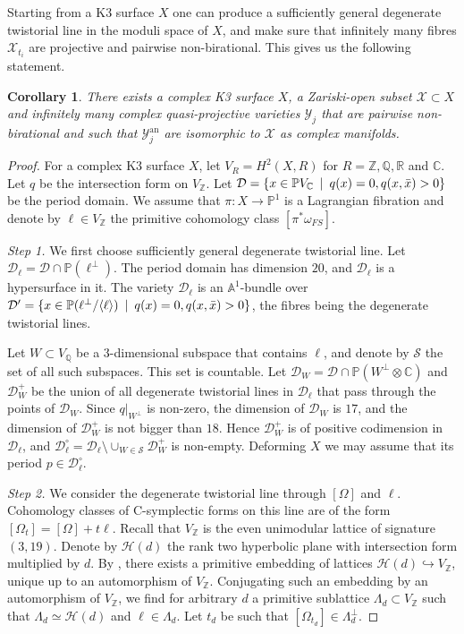 \documentclass[10pt]{amsart}
\newcommand{\bbA}{\mathbb{A}}
\newcommand{\bbZ}{\mathbb{Z}}
\newcommand{\bbQ}{\mathbb{Q}}
\newcommand{\bbR}{\mathbb{R}}
\newcommand{\bbC}{\mathbb{C}}
\newcommand{\bbP}{\mathbb{P}}
\newcommand{\DD}{\mathcal{D}}
\newcommand{\HH}{\mathcal{H}}
\newcommand{\XX}{\mathcal{X}}
\newcommand{\YY}{\mathcal{Y}}
\newcommand{\st}{\enskip |\enskip}
\newcommand{\hrarr}{\hookrightarrow}
\newtheorem{cor}[defn]{Corollary}
\begin{document}
Starting from a K3 surface $X$ one can
produce a sufficiently general degenerate twistorial line in the moduli space of $X$,
and make sure that infinitely many fibres $\XX_{t_i}$ are projective and
pairwise non-birational. This gives us the following statement.

\begin{cor}\label{cor_1}
There exists a complex K3 surface $X$, a Zariski-open subset $\XX\subset X$ and infinitely many complex quasi-projective
varieties $\YY_j$ that are pairwise non-birational and such that $\YY_j^{\mathrm{an}}$
are isomorphic to $\XX$ as complex manifolds.
\end{cor}
\begin{proof}
For a complex K3 surface $X$, let $V_R = H^2(X,R)$
for $R = \bbZ, \bbQ, \bbR$ and $\bbC$. Let $q$ be the intersection form
on $V_\bbZ$. Let $\DD = \{x\in \bbP V_{\bbC}\st q(x) = 0, q(x,\bar{x})>0\}$
be the period domain. We assume that $\pi\colon X\to \bbP^1$ is a Lagrangian fibration
and denote by $\ell \in V_\bbZ$ the primitive cohomology class $[\pi^*\omega_{FS}]$.

{\it Step 1.} We first choose sufficiently general degenerate twistorial line.
Let $\DD_\ell = \DD \cap \bbP(\ell^\perp)$. The period domain has dimension $20$,
and $\DD_\ell$ is a hypersurface in it. The variety $\DD_\ell$ is an $\bbA^1$-bundle
over $\DD' = \{x\in \bbP(\ell^\perp/\langle\ell\rangle)\st q(x) = 0, q(x,\bar{x})>0\}$, the
fibres being the degenerate twistorial lines.

Let $W\subset V_\bbQ$ be a 3-dimensional subspace that contains $\ell$, and denote
by $\mathcal{S}$ the set of all such subspaces. This set is countable. Let $\DD_W = \DD \cap \bbP(W^\perp\otimes\bbC)$
and $\DD_W^+$ be the union of all degenerate twistorial lines in $\DD_\ell$ that pass through the
points of $\DD_W$. Since $q|_{W^\perp}$ is non-zero, the dimension of $\DD_W$ is $17$,
and the dimension of $\DD_W^+$ is not bigger than $18$. Hence $\DD_W^+$ is of positive codimension in $\DD_\ell$,
and $\DD_\ell^\circ = \DD_\ell \setminus \cup_{W\in \mathcal{S}} \DD_W^+$ is non-empty.
Deforming $X$ we may assume that its period $p\in \DD_\ell^\circ$.

{\it Step 2.} We consider the degenerate twistorial line through $[\Omega]$ and $\ell$.
Cohomology classes of C-symplectic forms on this line are of the form
$[\Omega_t] = [\Omega] + t\ell$. Recall that $V_\bbZ$ is the even unimodular 
lattice of signature $(3,19)$. Denote by $\HH(d)$ the rank two hyperbolic
plane with intersection form multiplied by $d$. 
By \cite[Appendix to \S 6, Theorem 1]{PS}, there exists a primitive
embedding of lattices $\HH(d)\hrarr V_\bbZ$, unique up to an automorphism of $V_\bbZ$. Conjugating such an embedding
by an automorphism of $V_\bbZ$, we find for arbitrary $d$ a primitive sublattice $\Lambda_d\subset V_\bbZ$
such that $\Lambda_d\simeq \HH(d)$ and $\ell\in \Lambda_d$.
Let $t_d$ be such that $[\Omega_{t_d}] \in \Lambda_d^{\perp}$.


\end{proof}
\end{document}
